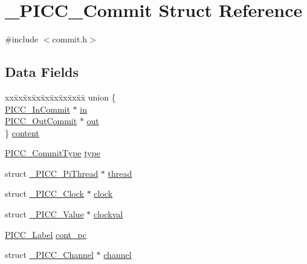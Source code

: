 \hypertarget{struct__PICC__Commit}{\section{\-\_\-\-P\-I\-C\-C\-\_\-\-Commit Struct Reference}
\label{struct__PICC__Commit}
}


{\ttfamily \#include $<$commit.\-h$>$}

\subsection*{Data Fields}
\begin{DoxyCompactItemize}
\item 
\begin{tabbing}
xx\=xx\=xx\=xx\=xx\=xx\=xx\=xx\=xx\=\kill
union \{\\
\>\hyperlink{commit_8h_a0f71a22c7590232b08181e5cc63de548}{PICC\_InCommit} $\ast$ \hyperlink{struct__PICC__Commit_a745a1a078043d4467bfa29ebf5d08a5b}{in}\\
\>\hyperlink{commit_8h_aecc9149969ed6c8695575a3c520b5bf2}{PICC\_OutCommit} $\ast$ \hyperlink{struct__PICC__Commit_a7ec6ea1ae1ab4b2b46da706874b4adda}{out}\\
\} \hyperlink{struct__PICC__Commit_a64f32e0f5452a5abf31a90440b13be6e}{content}\\

\end{tabbing}\end{DoxyCompactItemize}
{\bf }\par
\begin{DoxyCompactItemize}
\item 
\hyperlink{commit_8h_a2293a8e8b20ef3f60159b32fb2ac6d45}{P\-I\-C\-C\-\_\-\-Commit\-Type} \hyperlink{struct__PICC__Commit_a3300308e83e1bd4843a73089906a25a9}{type}
\item 
struct \hyperlink{struct__PICC__PiThread}{\-\_\-\-P\-I\-C\-C\-\_\-\-Pi\-Thread} $\ast$ \hyperlink{struct__PICC__Commit_a32fcb5ed4aa9281f5d9e6e64e6d65e36}{thread}
\item 
struct \hyperlink{struct__PICC__Clock}{\-\_\-\-P\-I\-C\-C\-\_\-\-Clock} $\ast$ \hyperlink{struct__PICC__Commit_acf28d34611ca5566a2681238e0d105ea}{clock}
\item 
struct \hyperlink{struct__PICC__Value}{\-\_\-\-P\-I\-C\-C\-\_\-\-Value} $\ast$ \hyperlink{struct__PICC__Commit_ad26ca86d6ec9cf47f14ce4eac9d2dfaf}{clockval}
\item 
\hyperlink{symbols_8h_ae23ad6ae115253385182f5a898d32c1e}{P\-I\-C\-C\-\_\-\-Label} \hyperlink{struct__PICC__Commit_ad0a2d3efd431b0f5a76713654b08f140}{cont\-\_\-pc}
\item 
struct \hyperlink{struct__PICC__Channel}{\-\_\-\-P\-I\-C\-C\-\_\-\-Channel} $\ast$ \hyperlink{struct__PICC__Commit_af80b43fa7c7a1fee8446a6b2efdaab03}{channel}
\end{DoxyCompactItemize}

